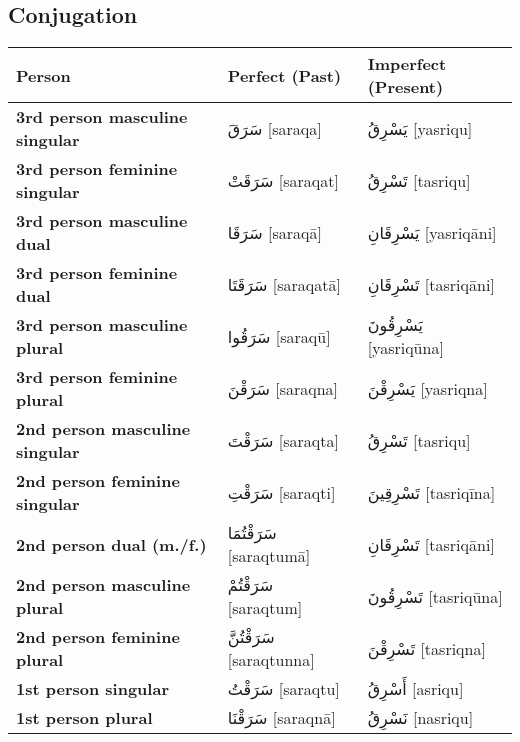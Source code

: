 \documentclass[letter,12pt]{article}
\begin{document}
\subsection{Conjugation}
\begin{longtable}{|>{\raggedright}p{3.5cm}|p{5cm}|p{5cm}|}
\hline
\textbf{Person} & \textbf{Perfect (Past)} & \textbf{Imperfect (Present)} \\
\hline
\textbf{3rd person masculine singular} & \textarabic{سَرَقَ} [saraqa] & \textarabic{يَسْرِقُ} [yasriqu] \\
\hline
\textbf{3rd person feminine singular} & \textarabic{سَرَقَتْ} [saraqat] & \textarabic{تَسْرِقُ} [tasriqu] \\
\hline
\textbf{3rd person masculine dual} & \textarabic{سَرَقَا} [saraqā] & \textarabic{يَسْرِقَانِ} [yasriqāni] \\
\hline
\textbf{3rd person feminine dual} & \textarabic{سَرَقَتَا} [saraqatā] & \textarabic{تَسْرِقَانِ} [tasriqāni] \\
\hline
\textbf{3rd person masculine plural} & \textarabic{سَرَقُوا} [saraqū] & \textarabic{يَسْرِقُونَ} [yasriqūna] \\
\hline
\textbf{3rd person feminine plural} & \textarabic{سَرَقْنَ} [saraqna] & \textarabic{يَسْرِقْنَ} [yasriqna] \\
\hline
\textbf{2nd person masculine singular} & \textarabic{سَرَقْتَ} [saraqta] & \textarabic{تَسْرِقُ} [tasriqu] \\
\hline
\textbf{2nd person feminine singular} & \textarabic{سَرَقْتِ} [saraqti] & \textarabic{تَسْرِقِينَ} [tasriqīna] \\
\hline
\textbf{2nd person dual (m./f.)} & \textarabic{سَرَقْتُمَا} [saraqtumā] & \textarabic{تَسْرِقَانِ} [tasriqāni] \\
\hline
\textbf{2nd person masculine plural} & \textarabic{سَرَقْتُمْ} [saraqtum] & \textarabic{تَسْرِقُونَ} [tasriqūna] \\
\hline
\textbf{2nd person feminine plural} & \textarabic{سَرَقْتُنَّ} [saraqtunna] & \textarabic{تَسْرِقْنَ} [tasriqna] \\
\hline
\textbf{1st person singular} & \textarabic{سَرَقْتُ} [saraqtu] & \textarabic{أَسْرِقُ} [asriqu] \\
\hline
\textbf{1st person plural} & \textarabic{سَرَقْنَا} [saraqnā] & \textarabic{نَسْرِقُ} [nasriqu] \\
\hline
\end{longtable}
\end{document}

